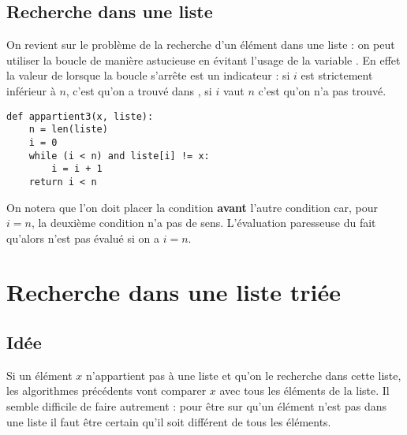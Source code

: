 \subsection{Recherche dans une liste}
On revient sur le problème de la recherche d'un élément dans une liste : on peut utiliser la boucle  de manière astucieuse en évitant l'usage de la variable . En effet la valeur de  lorsque la boucle s'arrête est un indicateur : si $i$ est strictement inférieur à $n$, c'est qu'on a trouvé  dans , si $i$ vaut $n$ c'est qu'on n'a pas trouvé.
\begin{lstlisting}
def appartient3(x, liste):
    n = len(liste)
    i = 0
    while (i < n) and liste[i] != x:
        i = i + 1
    return i < n
\end{lstlisting}
On notera que l'on doit placer la condition  {\bf avant} l'autre condition car, pour $i=n$, la deuxième condition n'a pas de sens. L'évaluation paresseuse du  fait qu'alors  n'est pas évalué si on a $i=n$.
\section{Recherche dans une liste triée}
\subsection{Idée}
Si un élément $x$ n'appartient pas à une liste et qu'on le recherche dans cette liste, les algorithmes précédents vont comparer $x$ avec tous les éléments de la liste. Il semble difficile de faire autrement : pour être sur qu'un élément n'est pas dans une liste il faut être certain qu'il soit différent de tous les éléments.

